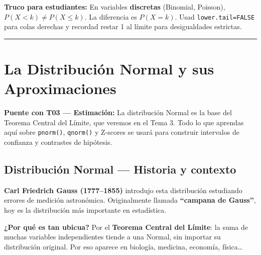 \documentclass[
  letterpaper,
  DIV=11,
  numbers=noendperiod]{scrartcl}
\begin{document}
\begin{tcolorbox}[enhanced jigsaw, arc=.35mm, bottomrule=.15mm, bottomtitle=1mm, breakable, colback=white, colbacktitle=quarto-callout-warning-color!10!white, colframe=quarto-callout-warning-color-frame, coltitle=black, left=2mm, leftrule=.75mm, opacityback=0, opacitybacktitle=0.6, rightrule=.15mm, title=\textcolor{quarto-callout-warning-color}{\faExclamationTriangle}\hspace{0.5em}{Warning}, titlerule=0mm, toprule=.15mm, toptitle=1mm]

\textbf{Truco para estudiantes:} En variables \textbf{discretas}
(Binomial, Poisson), \(P(X < k) \neq P(X \leq k)\). La diferencia es
\(P(X=k)\). Usad \texttt{lower.tail=FALSE} para colas derechas y
recordad restar 1 al límite para desigualdades estrictas.

\end{tcolorbox}

\begin{center}\rule{0.5\linewidth}{0.5pt}\end{center}

\section{La Distribución Normal y sus
Aproximaciones}\label{la-distribucion-normal-y-sus-aproximaciones}

\textbf{Puente con T03 --- Estimación:} La distribución Normal es la
base del Teorema Central del Límite, que veremos en el Tema 3. Todo lo
que aprendas aquí sobre \texttt{pnorm()}, \texttt{qnorm()} y Z-scores se
usará para construir intervalos de confianza y contrastes de hipótesis.

\subsection{Distribución Normal --- Historia y
contexto}\label{distribucion-normal-historia-y-contexto}

\textbf{Carl Friedrich Gauss (1777--1855)} introdujo esta distribución
estudiando errores de medición astronómica. Originalmente llamada
\textbf{``campana de Gauss''}, hoy es la distribución más importante en
estadística.

\textbf{¿Por qué es tan ubicua?} Por el \textbf{Teorema Central del
Límite}: la suma de muchas variables independientes tiende a una Normal,
sin importar su distribución original. Por eso aparece en biología,
medicina, economía, física\ldots{}
\end{document}
